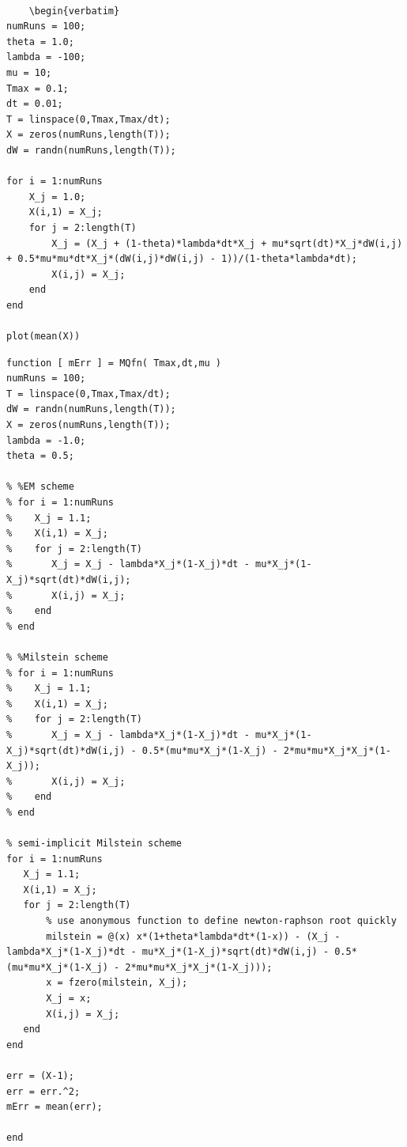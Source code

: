 \documentclass[11pt]{article} %
\begin{document}
\begin{verbatim}
    
    \begin{verbatim}
numRuns = 100;
theta = 1.0;
lambda = -100;
mu = 10;
Tmax = 0.1;
dt = 0.01;
T = linspace(0,Tmax,Tmax/dt);
X = zeros(numRuns,length(T));
dW = randn(numRuns,length(T));

for i = 1:numRuns
    X_j = 1.0;
    X(i,1) = X_j;
    for j = 2:length(T)
        X_j = (X_j + (1-theta)*lambda*dt*X_j + mu*sqrt(dt)*X_j*dW(i,j) + 0.5*mu*mu*dt*X_j*(dW(i,j)*dW(i,j) - 1))/(1-theta*lambda*dt);
        X(i,j) = X_j;
    end
end

plot(mean(X))
\end{verbatim}


    
    \begin{verbatim}
function [ mErr ] = MQfn( Tmax,dt,mu )
numRuns = 100;
T = linspace(0,Tmax,Tmax/dt);
dW = randn(numRuns,length(T));
X = zeros(numRuns,length(T));
lambda = -1.0;
theta = 0.5;

% %EM scheme
% for i = 1:numRuns
%    X_j = 1.1;
%    X(i,1) = X_j;
%    for j = 2:length(T)
%       X_j = X_j - lambda*X_j*(1-X_j)*dt - mu*X_j*(1-X_j)*sqrt(dt)*dW(i,j);
%       X(i,j) = X_j;
%    end
% end

% %Milstein scheme
% for i = 1:numRuns
%    X_j = 1.1;
%    X(i,1) = X_j;
%    for j = 2:length(T)
%       X_j = X_j - lambda*X_j*(1-X_j)*dt - mu*X_j*(1-X_j)*sqrt(dt)*dW(i,j) - 0.5*(mu*mu*X_j*(1-X_j) - 2*mu*mu*X_j*X_j*(1-X_j));
%       X(i,j) = X_j;
%    end
% end

% semi-implicit Milstein scheme
for i = 1:numRuns
   X_j = 1.1;
   X(i,1) = X_j;
   for j = 2:length(T)
       % use anonymous function to define newton-raphson root quickly
       milstein = @(x) x*(1+theta*lambda*dt*(1-x)) - (X_j - lambda*X_j*(1-X_j)*dt - mu*X_j*(1-X_j)*sqrt(dt)*dW(i,j) - 0.5*(mu*mu*X_j*(1-X_j) - 2*mu*mu*X_j*X_j*(1-X_j)));
       x = fzero(milstein, X_j);
       X_j = x;
       X(i,j) = X_j;
   end
end

err = (X-1);
err = err.^2;
mErr = mean(err);

end
\end{verbatim}
\end{document}
